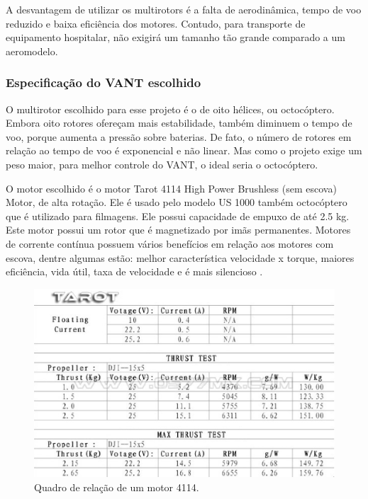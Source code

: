 A desvantagem de utilizar os multirotors é a falta de aerodinâmica, tempo de voo reduzido e baixa eficiência dos motores. Contudo, para transporte de equipamento hospitalar, não exigirá um tamanho tão grande comparado a um aeromodelo.

\subsubsection{Especificação do VANT escolhido}

O multirotor escolhido para esse projeto é o de oito hélices, ou octocóptero. Embora oito rotores ofereçam mais estabilidade, também diminuem o tempo de voo, porque aumenta a pressão sobre baterias. De fato, o número de rotores em relação ao tempo de voo é exponencial e não linear. Mas como o projeto exige um peso maior, para melhor controle do VANT, o ideal seria o octocóptero. 

O motor escolhido é o motor Tarot 4114 High Power Brushless (sem escova) Motor, de alta rotação. Ele é usado pelo modelo US 1000 também octocóptero que é utilizado para filmagens. Ele possui capacidade de empuxo de até 2.5 kg. Este motor possui um rotor que é magnetizado por imãs permanentes. Motores de corrente contínua possuem vários benefícios em relação aos motores com escova, dentre algumas estão: melhor característica velocidade x torque, maiores eficiência, vida útil, taxa de velocidade e é mais silencioso \cite{nascimento}.

\begin{figure}[H]
    \centering
      \includegraphics[keepaspectratio=true,scale=0.5]{figuras/tarot.eps}
    \caption{Quadro de relação de um motor 4114.}
    \label{fig:tarot}
\end{figure}

